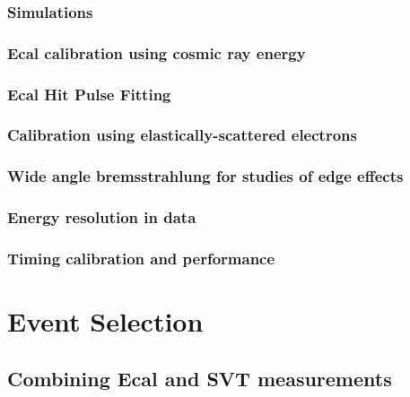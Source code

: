 \documentclass[12pt]{report}
\begin{document}
\subsection{Simulations}



\subsection{Ecal calibration using cosmic ray energy}




\subsection{Ecal Hit Pulse Fitting}




\subsection{Calibration using elastically-scattered electrons}




\subsection{Wide angle bremsstrahlung for studies of edge effects}




\subsection{Energy resolution in data}




\subsection{Timing calibration and performance}



\chapter{Event Selection}
\section{Combining Ecal and SVT measurements}
\end{document}
